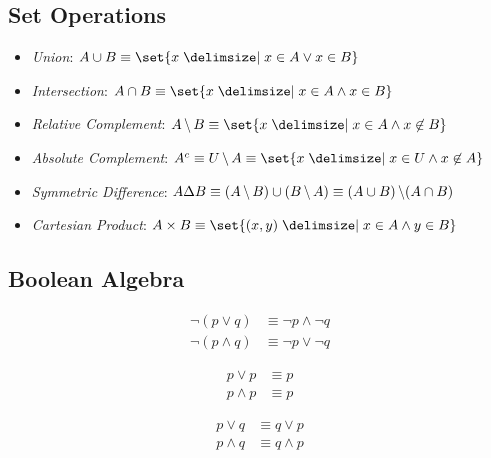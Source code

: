 \subsection{Set Operations}
\begin{itemize}
    \item \textit{Union}: $A \cup B \equiv \set{x \given x \in A \lor x \in B}$
    \item \textit{Intersection}: $A \cap B \equiv \set{x \given x \in A \land x \in B}$
    \item \textit{Relative Complement}: $A \Diff B \equiv \set{x \given x \in A \land x \not\in B}$
    \item \textit{Absolute Complement}: $\AbsComplement{A} \equiv U \Diff A \equiv \set{x \given x \in U \land x \not\in A}$
    \item \textit{Symmetric Difference}: $A \Delta B \equiv (A \operatorname{\backslash} B) \cup (B \operatorname{\backslash} A) \equiv (A \cup B)\operatorname{\backslash}(A \cap B)$
    \item \textit{Cartesian Product}: $A \times B \equiv \set{(x, y) \given x \in A \land y \in B}$
\end{itemize}

\subsection{Boolean Algebra}
\begin{definition}
\begin{align}
    \neg (p \lor q ) &\equiv \neg p \land \neg q \\
    \neg (p \land q) &\equiv \neg p \lor \neg q 
\end{align}
\end{definition}

\begin{definition}
\begin{align}
    p \lor p &\equiv p \\
    p \land p &\equiv p
\end{align}

\end{definition}

\begin{definition}
\begin{align}
    p \lor q &\equiv q \lor p \\
    p \land q &\equiv q \land p
\end{align}
\end{definition}

